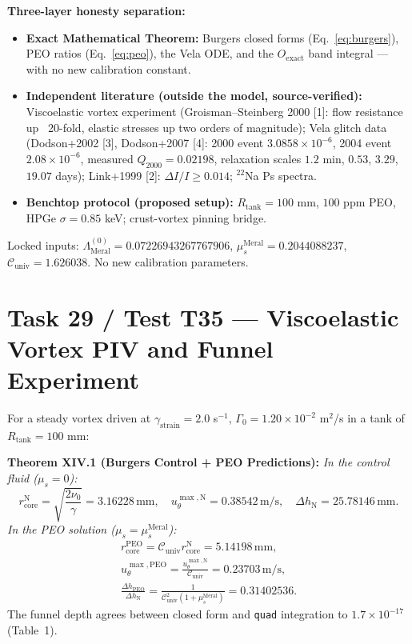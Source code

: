 \documentclass[12pt,a4paper]{article}
\begin{document}
\textbf{Three-layer honesty separation:}
\begin{itemize}
    \item \textbf{Exact Mathematical Theorem:} Burgers closed forms
    (Eq.~\ref{eq:burgers}), PEO ratios (Eq.~\ref{eq:peo}), the Vela ODE, and
    the $O_{\mathrm{exact}}$ band integral --- with no new calibration constant.
    \item \textbf{Independent literature (outside the model, source-verified):}
    Viscoelastic vortex experiment (Groisman--Steinberg 2000 [1]: flow
    resistance up ~20-fold, elastic stresses up two orders of magnitude);
    Vela glitch data (Dodson+2002 [3], Dodson+2007 [4]: 2000 event
    $3.0858\times10^{-6}$, 2004 event $2.08\times10^{-6}$, measured
    $Q_{2000}=0.02198$, relaxation scales $1.2$ min, $0.53$, $3.29$, $19.07$
    days); Link+1999 [2]: $\Delta I/I\ge 0.014$; $^{22}$Na Ps spectra.
    \item \textbf{Benchtop protocol (proposed setup):} $R_{\mathrm{tank}}=100$
    mm, $100$ ppm PEO, HPGe $\sigma=0.85$ keV; crust-vortex pinning bridge.
\end{itemize}
Locked inputs: $\Lambda_{\mathrm{Meral}}^{(0)} = 0.07226943267767906$,
$\mu_s^{\mathrm{Meral}} = 0.2044088237$,
$\mathcal{C}_{\mathrm{univ}} = 1.626038$. No new calibration parameters.

\section{Task 29 / Test T35 --- Viscoelastic Vortex PIV and Funnel Experiment}

For a steady vortex driven at $\gamma_{\mathrm{strain}}=2.0$ s$^{-1}$,
$\Gamma_0=1.20\times 10^{-2}$ m$^2$/s in a tank of $R_{\mathrm{tank}}=100$ mm:

\textbf{Theorem XIV.1 (Burgers Control + PEO Predictions):} \textit{In the
control fluid ($\mu_s=0$):}
\begin{equation}
\label{eq:burgers}
\boxed{r_{\mathrm{core}}^{\mathrm{N}}=\sqrt{\frac{2\nu_0}{\gamma}}
=3.16228\,\mathrm{mm},\quad
u_\theta^{\max,\mathrm{N}}=0.38542\,\mathrm{m/s},\quad
\Delta h_{\mathrm{N}}=25.78146\,\mathrm{mm}.}
\end{equation}
\textit{In the PEO solution ($\mu_s=\mu_s^{\mathrm{Meral}}$):}
\begin{equation}
\label{eq:peo}
\begin{split}
\boxed{r_{\mathrm{core}}^{\mathrm{PEO}}=\mathcal{C}_{\mathrm{univ}}r_{\mathrm{core}}^{\mathrm{N}}
=5.14198\,\mathrm{mm},} \\
\boxed{u_\theta^{\max,\mathrm{PEO}}=\frac{u_\theta^{\max,\mathrm{N}}}{\mathcal{C}_{\mathrm{univ}}}
=0.23703\,\mathrm{m/s},} \\
\boxed{\frac{\Delta h_{\mathrm{PEO}}}{\Delta h_{\mathrm{N}}}
=\frac{1}{\mathcal{C}_{\mathrm{univ}}^2(1+\mu_s^{\mathrm{Meral}})}=0.31402536.}
\end{split}
\end{equation}
The funnel depth agrees between closed form and \texttt{quad} integration to
$1.7\times 10^{-17}$ (Table~1).
\end{document}

